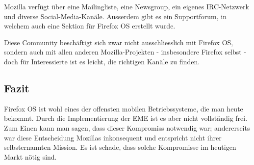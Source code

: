 Mozilla verfügt über eine Mailingliste\thinspace\cite{online:mozilla-mailinglist}, eine Newsgroup\thinspace\cite{online:mozilla-community}, ein eigenes IRC-Netzwerk\thinspace\cite{online:mozilla-community} und diverse Social-Media-Kanäle\thinspace\cite{online:mozilla-google-group}\thinspace\cite{online:mozilla-twitter}. Ausserdem gibt es ein Supportforum\thinspace\cite{online:mozilla-support}, in welchem auch eine Sektion für Firefox OS erstellt wurde. 

Diese Community beschäftigt sich zwar nicht ausschliesslich mit Firefox OS, sondern auch mit allen anderen Mozilla-Projekten - insbesondere Firefox selbst - doch für Interessierte ist es leicht, die richtigen Kanäle zu finden.\\

\subsection{Fazit}
Firefox OS ist wohl eines der offensten mobilen Betriebssysteme, die man heute bekommt. Durch die Implementierung der EME ist es aber nicht vollständig frei. Zum Einen kann man sagen, dass dieser Kompromiss notwendig war; andererseits war diese Entscheidung Mozillas inkonsequent und entspricht nicht ihrer selbsternannten Mission. Es ist schade, dass solche Kompromisse im heutigen Markt nötig sind.